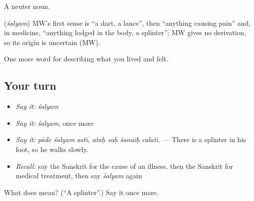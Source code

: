 A neuter noun.

\begin{cousinweb}
\textbf{} (\emph{śalyam}) MW's first sense is \textquotedblleft{}a dart, a lance\textquotedblright{}, then \textquotedblleft{}anything causing pain\textquotedblright{} and, in medicine, \textquotedblleft{}anything lodged in the body, a splinter\textquotedblright{}; MW gives no derivation, so its origin is uncertain (MW).
\end{cousinweb}

\begin{grammarlens}[title={What you've built}]
One more word for describing what you lived and felt.
\end{grammarlens}

\subsection*{Your turn}
\begin{itemize}
\raggedright
  \item \emph{Say it:} \emph{śalyam}
  \item \emph{Say it:} \emph{śalyam}, once more
  \item \emph{Say it:} \emph{pāde śalyam asti, ataḥ saḥ śanaiḥ calati.} — There is a splinter in his foot, so he walks slowly.
  \item \emph{Recall:} say the Sanskrit for the cause of an illness, then the Sanskrit for medical treatment, then say \emph{śalyam} again
\end{itemize}

\begin{tcolorbox}[breakable,colback=teal!4,colframe=teal!35!black,title={Before you move on}]
What does  mean? (\textquotedblleft{}A splinter\textquotedblright{}.) Say it once more.
\end{tcolorbox}
